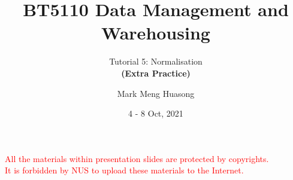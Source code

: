 
\title{BT5110 Data Management and Warehousing}

\subtitle{Tutorial 5: Normalisation\\ \textbf{(Extra Practice)}}

\author{Mark Meng Huasong}



\date{4 - 8 Oct, 2021}

\begin{frame}
	\titlepage
	\begin{tcolorbox}
		\begin{center}
			{\scriptsize \textcolor{red}{All the materials within presentation slides are protected by copyrights.\\
					It is forbidden by NUS to upload these materials to the Internet.}}
		\end{center}
	\end{tcolorbox}
\end{frame}

